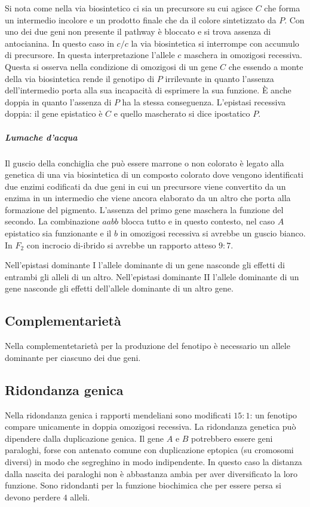 Si nota come nella via biosintetico ci sia un precursore su cui agisce $C$ che forma un intermedio incolore e un prodotto finale che da il colore sintetizzato da $P$. Con uno dei
due geni non presente il pathway \`e bloccato e si trova assenza di antocianina. In questo caso in $c/c$ la via biosintetica si interrompe con accumulo di precursore. In questa 
interpretazione l'allele $c$ maschera in omozigosi recessiva. Questa si osserva nella condizione di omozigosi di un gene $C$ che essendo a monte della via biosintetica rende il 
genotipo di $P$ irrilevante in quanto l'assenza dell'intermedio porta alla sua incapacit\`a di esprimere la sua funzione. \`E anche doppia in quanto l'assenza di $P$ ha la stessa
conseguenza. L'epistasi recessiva doppia: il gene epistatico \`e $C$ e quello mascherato si dice ipostatico $P$. \\
\subparagraph{Lumache d'acqua}
Il guscio della conchiglia che pu\`o essere marrone o non colorato \`e legato alla genetica di una via biosintetica di un composto colorato dove vengono identificati due enzimi 
codificati da due geni in cui un precursore viene convertito da un enzima in un intermedio che viene ancora elaborato da un altro che porta alla formazione del pigmento. L'assenza 
del primo gene maschera la funzione del secondo. La combinazione $aabb$ blocca tutto e in questo contesto, nel caso $A$ epistatico sia funzionante e il $b$ in omozigosi 
recessiva si avrebbe un guscio bianco. In $F_2$ con incrocio di-ibrido si avrebbe un rapporto atteso $9:7$.



Nell'epistasi dominante I l'allele dominante di un gene nasconde gli effetti di entrambi gli alleli di un altro.
Nell'epistasi dominante II l'allele dominante di un gene nasconde gli effetti dell'allele dominante di un altro gene.
\subsection{Complementariet\`a}
Nella complementetariet\`a per la produzione del fenotipo \`e necessario un allele dominante per ciascuno dei due geni. 

\subsection{Ridondanza genica}
Nella ridondanza genica i rapporti mendeliani sono modificati $15:1$: un fenotipo compare unicamente in doppia omozigosi recessiva. La ridondanza genetica pu\`o dipendere dalla
duplicazione genica. Il gene $A$ e $B$ potrebbero essere geni paraloghi, forse con antenato comune con duplicazione eptopica (su cromosomi diversi) in modo che segreghino in modo
indipendente. In questo caso la distanza dalla nascita dei paraloghi non \`e abbastanza ambia per aver diversificato la loro funzione. Sono ridondanti per la funzione biochimica che
per essere persa si devono perdere $4$ alleli. 
